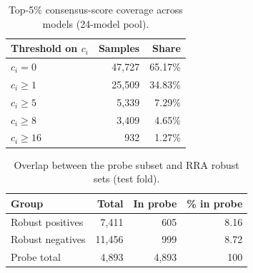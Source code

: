 \begin{table}[H]
  \centering
  \caption{Top-5\% consensus-score coverage across models (24-model pool).}
  \label{tab:consensus_thresholds}
  \begin{tabular}{lrr}
    \toprule
    \textbf{Threshold on \(c_i\)} & \textbf{Samples} & \textbf{Share} \\
    \midrule
    \(c_i=0\)                     & 47{,}727         & 65.17\%        \\
    \(c_i\ge 1\)                  & 25{,}509         & 34.83\%        \\
    \(c_i\ge 5\)                  & 5{,}339          & 7.29\%         \\
    \(c_i\ge 8\)                  & 3{,}409          & 4.65\%         \\
    \(c_i\ge 16\)                 & 932              & 1.27\%         \\
    \bottomrule
  \end{tabular}
\end{table}

\begin{table}[H]
  \centering
  \caption{Overlap between the probe subset and RRA robust sets (test fold).}
  \label{tab:rra_probe_overlap}
  \begin{tabular}{lrrr}
    \toprule
    \textbf{Group}   & \textbf{Total} & \textbf{In probe} & \textbf{\% in probe} \\
    \midrule
    Robust positives & 7{,}411        & 605               & 8.16                 \\
    Robust negatives & 11{,}456       & 999               & 8.72                 \\
    Probe total      & 4{,}893        & 4{,}893           & 100                  \\
    \bottomrule
  \end{tabular}
\end{table}

